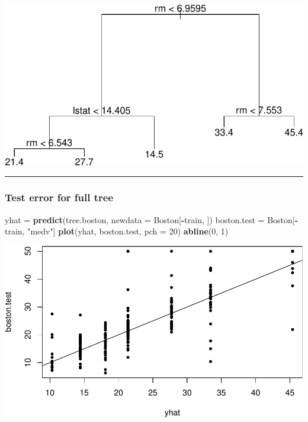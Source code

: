 \documentclass[]{article}
\newenvironment{Shaded}{\begin{snugshade}}{\end{snugshade}}
\newcommand{\DataTypeTok}[1]{\textcolor[rgb]{0.13,0.29,0.53}{#1}}
\newcommand{\DecValTok}[1]{\textcolor[rgb]{0.00,0.00,0.81}{#1}}
\newcommand{\KeywordTok}[1]{\textcolor[rgb]{0.13,0.29,0.53}{\textbf{#1}}}
\newcommand{\NormalTok}[1]{#1}
\newcommand{\OperatorTok}[1]{\textcolor[rgb]{0.81,0.36,0.00}{\textbf{#1}}}
\newcommand{\StringTok}[1]{\textcolor[rgb]{0.31,0.60,0.02}{#1}}
\begin{document}
\includegraphics{8Trees_files/figure-latex/unnamed-chunk-41-1.pdf}

\begin{center}\rule{0.5\linewidth}{\linethickness}\end{center}

\hypertarget{test-error-for-full-tree}{%
\subsubsection{Test error for full
tree}\label{test-error-for-full-tree}}

\begin{Shaded}
\begin{Highlighting}[]
\NormalTok{yhat =}\StringTok{ }\KeywordTok{predict}\NormalTok{(tree.boston, }\DataTypeTok{newdata =}\NormalTok{ Boston[}\OperatorTok{-}\NormalTok{train, ])}
\NormalTok{boston.test =}\StringTok{ }\NormalTok{Boston[}\OperatorTok{-}\NormalTok{train, }\StringTok{"medv"}\NormalTok{]}
\KeywordTok{plot}\NormalTok{(yhat, boston.test, }\DataTypeTok{pch =} \DecValTok{20}\NormalTok{)}
\KeywordTok{abline}\NormalTok{(}\DecValTok{0}\NormalTok{, }\DecValTok{1}\NormalTok{)}
\end{Highlighting}
\end{Shaded}

\includegraphics{8Trees_files/figure-latex/unnamed-chunk-42-1.pdf}
\end{document}
